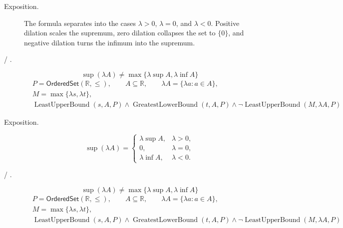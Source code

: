 \begin{remark*}
\begin{description}
  \item[Exposition.]
The formula separates into the cases $\lambda>0$, $\lambda=0$, and $\lambda<0$. Positive dilation scales the supremum, zero dilation collapses the set to $\{0\}$, and negative dilation turns the infimum into the supremum.


  \item[ / .]
  \[
\sup(\lambda A)\ne \max\{\lambda\sup A,\lambda\inf A\}
\]
\[
\begin{aligned}
&P=\mathsf{OrderedSet}(\mathbb{R},\leq),\qquad A\subseteq\mathbb{R},\qquad \lambda A=\{\lambda a:a\in A\},\\
&M=\max\{\lambda s,\lambda t\},\\
&\operatorname{LeastUpperBound}(s,A,P)\land \operatorname{GreatestLowerBound}(t,A,P)
\land
\neg\operatorname{LeastUpperBound}(M,\lambda A,P)
\end{aligned}
\]
\end{description}
\end{remark*}

\begin{remark*}
\begin{description}
  \item[Exposition.]
\[
\sup(\lambda A)=
\begin{cases}
\lambda\sup A, & \lambda>0,\\
0, & \lambda=0,\\
\lambda\inf A, & \lambda<0.
\end{cases}
\]


  \item[ / .]
  \[
\sup(\lambda A)\ne \max\{\lambda\sup A,\lambda\inf A\}
\]
\[
\begin{aligned}
&P=\mathsf{OrderedSet}(\mathbb{R},\leq),\qquad A\subseteq\mathbb{R},\qquad \lambda A=\{\lambda a:a\in A\},\\
&M=\max\{\lambda s,\lambda t\},\\
&\operatorname{LeastUpperBound}(s,A,P)\land \operatorname{GreatestLowerBound}(t,A,P)
\land
\neg\operatorname{LeastUpperBound}(M,\lambda A,P)
\end{aligned}
\]
\end{description}
\end{remark*}

